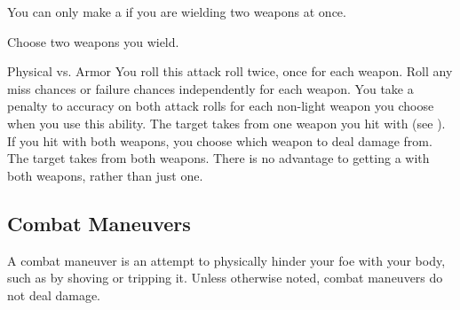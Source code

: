         \label{Dual Strike}
        You can only make a  if you are wielding two weapons at once.
        \begin{ability}
            \begin{spelltargetinginfo}
                \spellspecial Choose two weapons you wield.
            \end{spelltargetinginfo}
            \begin{spelleffects}
                \begin{spellattack}{Physical vs. Armor}
                    \spellspecial You roll this attack roll twice, once for each weapon.
                    Roll any miss chances or failure chances independently for each weapon.
                    You take a  penalty to accuracy on both attack rolls for each non-light weapon you choose when you use this ability.
                    \spellsuccess The target takes  from one weapon you hit with (see ).
                    If you hit with both weapons, you choose which weapon to deal damage from.
                    \spellcritical The target takes  from both weapons.
                    There is no advantage to getting a  with both weapons, rather than just one.
                \end{spellattack}
            \end{spelleffects}
        \end{ability}

    \subsection{Combat Maneuvers}\label{Combat Maneuvers}
        A combat maneuver is an attempt to physically hinder your foe with your body, such as by shoving or tripping it.
        Unless otherwise noted, combat maneuvers do not deal damage.


